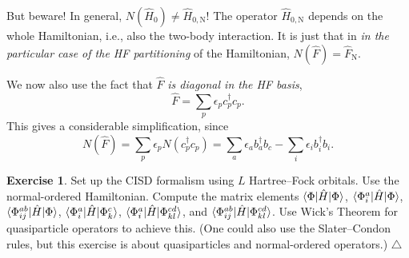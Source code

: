 \documentclass{report}
\theoremstyle{plain}
\theoremstyle{definition}
\newtheorem{exerc}{Exercise}[chapter]
\newcommand\xqed[1]{%
  \leavevmode\unskip\penalty9999 \hbox{}\nobreak\hfill
  \quad\hbox{#1}}
\newcommand\demo{\xqed{$\triangle$}}
\newenvironment{exercise}{\bigskip\begin{exerc}}{\demo\end{exerc}\bigskip}
\begin{document}
But beware! In general, $N(\hat{H}_0) \neq \hat{H}_{0,\text{N}}$! The
operator $\hat{H}_{0,\text{N}}$ depends on the whole Hamiltonian,
i.e., also the two-body interaction. It is just that in \emph{in the
  particular case of the HF partitioning} of the Hamiltonian,
$N(\hat{F}) = \hat{F}_\text{N}$.

We now also use the fact that $\hat{F}$ \emph{is diagonal in the HF basis},
\begin{equation}
  \hat{F} = \sum_p \epsilon_p c^\dag_p c_p.
\end{equation}
This gives a considerable simplification, since
\begin{equation}
  N(\hat{F}) = \sum_p \epsilon_p N(c^\dag_p c_p) = \sum_a \epsilon_a
  b^\dag_a b_c - \sum_i \epsilon_i b^\dag_i b_i.
\end{equation}

\begin{exercise}
  Set up the CISD formalism using $L$ Hartree--Fock orbitals. Use the
  normal-ordered Hamiltonian. Compute the
  matrix elements $\braket{\Phi|\hat{H}|\Phi}$,
  $\braket{\Phi_i^a|\hat{H}|\Phi}$,
  $\braket{\Phi_{ij}^{ab}|\hat{H}|\Phi}$,
  $\braket{\Phi_i^a|\hat{H}|\Phi_k^c}$,
  $\braket{\Phi_{i}^{a}|\hat{H}|\Phi_{kl}^{cd}}$, and
  $\braket{\Phi_{ij}^{ab}|\hat{H}|\Phi_{kl}^{cd}}$. Use Wick's Theorem
  for quasiparticle operators to achieve this. (One could also use the
  Slater--Condon rules, but this exercise is about quasiparticles and
  normal-ordered operators.)
\end{exercise}  




\end{document}
